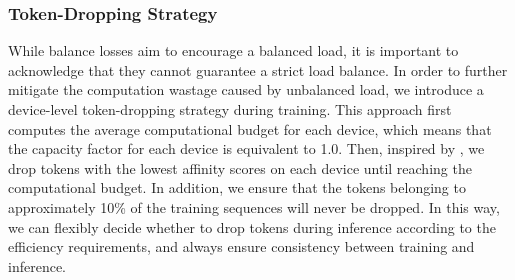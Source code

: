 \subsubsection{Token-Dropping Strategy}

While balance losses aim to encourage a balanced load, it is important to acknowledge that they cannot guarantee a strict load balance. 
In order to further mitigate the computation wastage caused by unbalanced load, we introduce a device-level token-dropping strategy during training. 
This approach first computes the average computational budget for each device, which means that the capacity factor for each device is equivalent to 1.0. 
Then, inspired by \citet{bpr}, we drop tokens with the lowest affinity scores on each device until reaching the computational budget. 
In addition, we ensure that the tokens belonging to approximately 10\% of the training sequences will never be dropped. 
In this way, we can flexibly decide whether to drop tokens during inference according to the efficiency requirements, and always ensure consistency between training and inference. 
